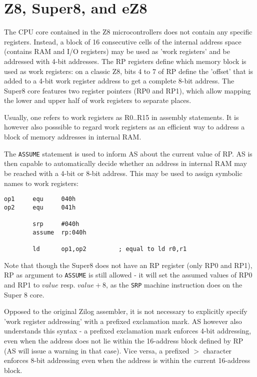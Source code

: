 \documentclass[12pt,twoside]{report}
\newcommand{\tty}[1]{{\tt #1}}
\newcommand{\asname}{{AS}}
\begin{document}

\section{Z8, Super8, and eZ8}
\label{Z8Spec}

The CPU core contained in the Z8 microcontrollers does not
contain any specific registers.  Instead, a block of 16
consecutive cells of the internal address space (contains RAM and
I/O registers) may be used as 'work registers' and be addressed
with 4-bit addresses.  The RP registers define which memory block
is used as work registers: on a classic Z8, bits 4 to 7 of RP
define the 'offset' that is added to a 4-bit work register
address to get a complete 8-bit address.  The Super8 core
features two register pointers (RP0 and RP1), which allow mapping
the lower and upper half of work registers to separate places.

Usually, one refers to work registers as R0..R15 in assembly
statements.  It is however also posssible to regard work registers as
an efficient way to address a block of memory addresses in internal
RAM.

The \tty{ASSUME} statement is used to inform \asname{} about the current
value of RP. \asname{} is then capable to automatically decide whether an
address in internal RAM may be reached with a 4-bit or 8-bit address.
This may be used to assign symbolic names to work registers:
\begin{verbatim}
op1     equ     040h
op2     equ     041h

        srp     #040h
        assume  rp:040h

        ld      op1,op2         ; equal to ld r0,r1
\end{verbatim}
Note that though the Super8 does not have an RP register (only
RP0 and RP1), RP as argument to \tty{ASSUME} is still allowed -
it will set the assumed values of RP0 and RP1 to $value$ resp.
$value+8$, as the \tty{SRP} machine instruction does on the Super
8 core.

Opposed to the original Zilog assembler, it is not necessary to
explicitly specify 'work register addressing' with a prefixed
exclamation mark.  \asname{} however also understands this syntax - a
prefixed exclamation mark enforces 4-bit addressing, even when the
address does not lie within the 16-address block defined by RP (\asname{} will
issue a warning in that case).  Vice versa, a prefixed $>$
character enforces 8-bit addressing even when the address is within
the current 16-address block.
\end{document}
